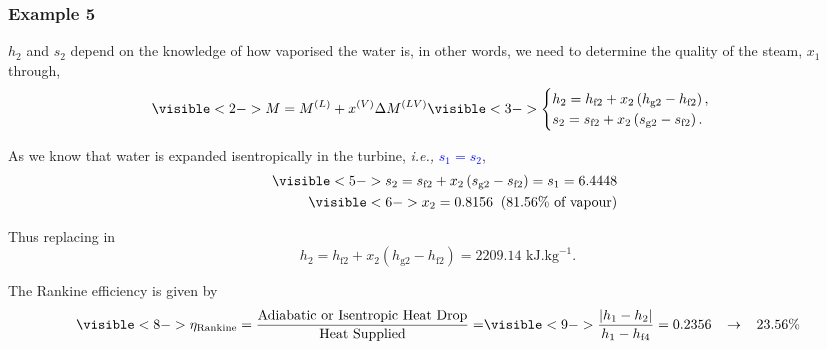 \documentclass[10pt,compress,handout,ignorenonframetext,unknownkeysallowed]{beamer}
\newcommand{\frc}{\displaystyle\frac}
\newcommand{\blue}{\textcolor{blue}}
\newcommand{\ie}{{\it i.e., }}
\newcommand{\mfr}[3][error]{#1_{#2}^{\left(#3\right)}}
\begin{document}
\begin{frame}
   \frametitle{Example 5}
          {$h_{2}$ and $s_{2}$ depend on the knowledge of how vaporised the water is, in other words, we need to determine the quality of the steam, $x_{1}$ through},
         \begin{displaymath}
              \visible<2->{M = \mfr[M]{}{L} + \mfr[x]{}{V}\Delta\mfr[M]{}{LV}}
              \visible<3->{ \begin{cases}
                      h_{2} = h_{\text{f}2} + x_{2}\left(h_{\text{g}2} - h_{\text{f}2}\right), \\
                      s_{2} = s_{\text{f}2} + x_{2}\left(s_{\text{g}2} - s_{\text{f}2}\right).  
              \end{cases}}
         \end{displaymath}

          {As we know that water is expanded isentropically in the turbine, \ie \blue{$s_{1}=s_{2}$},}
         \begin{eqnarray}
             && \visible<5-> {s_{2} = s_{\text{f}2} + x_{2}\left(s_{\text{g}2} - s_{\text{f}2}\right) = s_{1} = 6.4448}  \nonumber \\
             && \visible<6-> {x_{2} = 0.8156 \;\;(81.56\% \text{ of vapour})}\nonumber
         \end{eqnarray}

          {Thus replacing in 
             \begin{displaymath}
                h_{2} = h_{\text{f}2} + x_{2}\left(h_{\text{g}2} - h_{\text{f}2}\right) = 2209.14\text{ kJ.kg}^{-1}.
             \end{displaymath}}

          {The Rankine efficiency is given by}
             \begin{displaymath}
                 \visible<8-> {\eta_{\text{Rankine}} = \frc{\text{Adiabatic or Isentropic Heat Drop}}{\text{Heat Supplied}} =} \visible<9-> {\frc{\left|h_{1}-h_{2}\right|}{h_{1}-h_{\text{f}4}} = 0.2356\;\;\;\rightarrow \;\;\; 23.56\%}
             \end{displaymath}
\end{frame}
\end{document}
